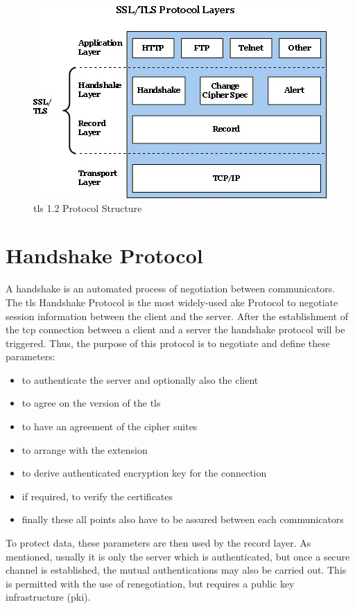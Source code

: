 \begin{figure}[H]
	\centering
		\includegraphics[scale=1]{images/tls_structure.jpg}
	\caption{\gls{tls} 1.2 Protocol Structure \cite{ms:overview}}
	\label{fig:tls_structure}
\end{figure}

\section{Handshake Protocol}
\label{sec:handshake_protocol}
 A handshake is an automated process of negotiation between communicators. The \gls{tls} Handshake Protocol is the most widely-used \gls{ake} Protocol to negotiate session information between the client and the server. 
 After the establishment of the \gls{tcp} connection between a client and a server the handshake protocol will be triggered. 
 Thus, the purpose of this protocol is to negotiate and define these parameters:
 
 \begin{itemize}
\item to authenticate the server and optionally also the client
 \item to agree on the version of the \gls{tls}
 \item to have an agreement of the cipher suites
 \item to arrange with the extension
 \item to derive authenticated encryption key for the connection
 \item if required, to verify the certificates
 \item finally these all points also have to be assured between each communicators
\end{itemize}

To protect data, these parameters are then used by the record layer. As mentioned, usually it is only the server which is authenticated, but once a secure channel is established, the mutual authentications may also be carried out. This is permitted with the use of renegotiation, but requires a public key infrastructure (\gls{pki}). 
\cite{ms:overview}
\cite{ms:handshake}

